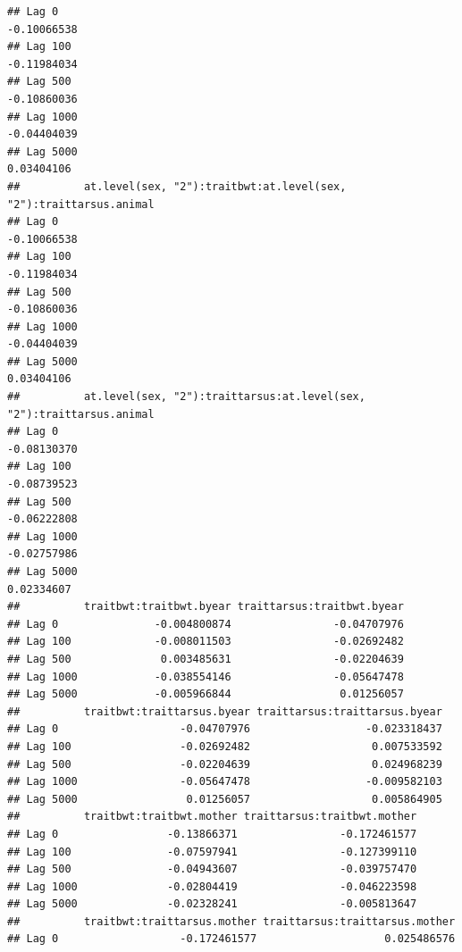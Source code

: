 \documentclass[
  12pt,
]{book}
\begin{document}
\begin{verbatim}
## Lag 0                                                          -0.10066538
## Lag 100                                                        -0.11984034
## Lag 500                                                        -0.10860036
## Lag 1000                                                       -0.04404039
## Lag 5000                                                        0.03404106
##          at.level(sex, "2"):traitbwt:at.level(sex, "2"):traittarsus.animal
## Lag 0                                                          -0.10066538
## Lag 100                                                        -0.11984034
## Lag 500                                                        -0.10860036
## Lag 1000                                                       -0.04404039
## Lag 5000                                                        0.03404106
##          at.level(sex, "2"):traittarsus:at.level(sex, "2"):traittarsus.animal
## Lag 0                                                             -0.08130370
## Lag 100                                                           -0.08739523
## Lag 500                                                           -0.06222808
## Lag 1000                                                          -0.02757986
## Lag 5000                                                           0.02334607
##          traitbwt:traitbwt.byear traittarsus:traitbwt.byear
## Lag 0               -0.004800874                -0.04707976
## Lag 100             -0.008011503                -0.02692482
## Lag 500              0.003485631                -0.02204639
## Lag 1000            -0.038554146                -0.05647478
## Lag 5000            -0.005966844                 0.01256057
##          traitbwt:traittarsus.byear traittarsus:traittarsus.byear
## Lag 0                   -0.04707976                  -0.023318437
## Lag 100                 -0.02692482                   0.007533592
## Lag 500                 -0.02204639                   0.024968239
## Lag 1000                -0.05647478                  -0.009582103
## Lag 5000                 0.01256057                   0.005864905
##          traitbwt:traitbwt.mother traittarsus:traitbwt.mother
## Lag 0                 -0.13866371                -0.172461577
## Lag 100               -0.07597941                -0.127399110
## Lag 500               -0.04943607                -0.039757470
## Lag 1000              -0.02804419                -0.046223598
## Lag 5000              -0.02328241                -0.005813647
##          traitbwt:traittarsus.mother traittarsus:traittarsus.mother
## Lag 0                   -0.172461577                    0.025486576

\end{verbatim}
\end{document}
